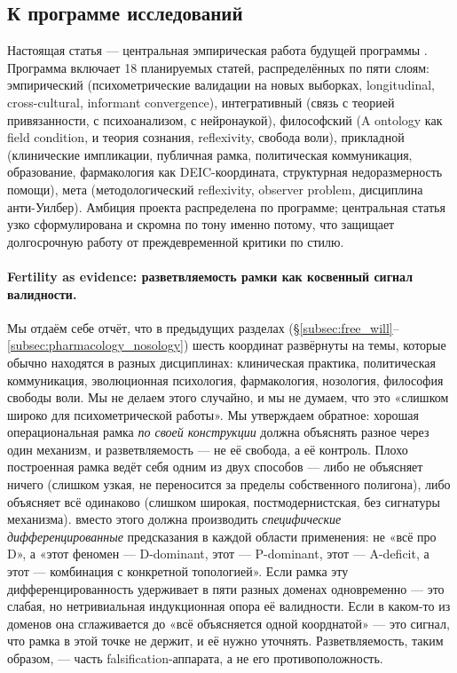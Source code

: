 \subsection{К программе исследований}

Настоящая статья --- центральная эмпирическая работа будущей программы \DEIC{}. Программа включает 18 планируемых статей, распределённых по пяти слоям: эмпирический (психометрические валидации на новых выборках, longitudinal, cross-cultural, informant convergence), интегративный (связь с теорией привязанности, с психоанализом, с нейронаукой), философский (A ontology как field condition, \DEIC{} и теория сознания, reflexivity, свобода воли), прикладной (клинические импликации, публичная рамка, политическая коммуникация, образование, фармакология как DEIC-координата, структурная недоразмерность помощи), мета (методологический reflexivity, observer problem, дисциплина анти-Уилбер). Амбиция проекта распределена по программе; центральная статья узко сформулирована и скромна по тону именно потому, что защищает долгосрочную работу от преждевременной критики по стилю.

\paragraph{Fertility as evidence: разветвляемость рамки как косвенный сигнал валидности.} Мы отдаём себе отчёт, что в предыдущих разделах (§\ref{subsec:free_will}--\ref{subsec:pharmacology_nosology}) шесть координат \DEIC{} развёрнуты на темы, которые обычно находятся в разных дисциплинах: клиническая практика, политическая коммуникация, эволюционная психология, фармакология, нозология, философия свободы воли. Мы не делаем этого случайно, и мы не думаем, что это «слишком широко для психометрической работы». Мы утверждаем обратное: хорошая операциональная рамка \emph{по своей конструкции} должна объяснять разное через один механизм, и разветвляемость --- не её свобода, а её контроль. Плохо построенная рамка ведёт себя одним из двух способов --- либо не объясняет ничего (слишком узкая, не переносится за пределы собственного полигона), либо объясняет всё одинаково (слишком широкая, постмодернистская, без сигнатуры механизма). \DEIC{} вместо этого должна производить \emph{специфические дифференцированные} предсказания в каждой области применения: не «всё про D», а «этот феномен --- D-dominant, этот --- P-dominant, этот --- A-deficit, а этот --- комбинация с конкретной топологией». Если рамка эту дифференцированность удерживает в пяти разных доменах одновременно --- это слабая, но нетривиальная индукционная опора её валидности. Если в каком-то из доменов она сглаживается до «всё объясняется одной коорднатой» --- это сигнал, что рамка в этой точке не держит, и её нужно уточнять. Разветвляемость, таким образом, --- часть falsification-аппарата, а не его противоположность.

